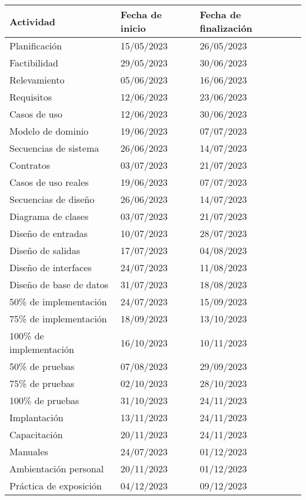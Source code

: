 \begin{center}
\begin{longtable}{
	| p{5.3cm} | p{5.3cm} | p{5.3cm} |
}
	\hline
	\rowcolor{lightgray}
	\hfil \textbf{Actividad} &
	\hfil \textbf{Fecha de inicio} &
	\hfil \textbf{Fecha de finalizaci\'on}
	\\
	\hline
	\endhead
 	Planificaci\'on &
 	15/05/2023 & 26/05/2023 \\
	\hline
 	Factibilidad &
 	29/05/2023 & 30/06/2023 \\
	\hline
 	Relevamiento &
 	05/06/2023 & 16/06/2023 \\
	\hline
 	Requisitos &
 	12/06/2023 & 23/06/2023 \\
	\hline
 	Casos de uso &
 	12/06/2023 & 30/06/2023 \\
	\hline
 	Modelo de dominio &
 	19/06/2023 & 07/07/2023 \\
	\hline
 	Secuencias de sistema &
 	26/06/2023 & 14/07/2023 \\
	\hline
 	Contratos &
 	03/07/2023 & 21/07/2023 \\
	\hline
 	Casos de uso reales &
 	19/06/2023 & 07/07/2023 \\
	\hline
 	Secuencias de dise\~no &
 	26/06/2023 & 14/07/2023 \\
	\hline
 	Diagrama de clases &
 	03/07/2023 & 21/07/2023 \\
	\hline
 	Dise\~no de entradas &
 	10/07/2023 & 28/07/2023 \\
	\hline
 	Dise\~no de salidas &
 	17/07/2023 & 04/08/2023 \\
	\hline
 	Dise\~no de interfaces &
 	24/07/2023 & 11/08/2023 \\
	\hline
 	Dise\~no de base de datos &
 	31/07/2023 & 18/08/2023 \\
	\hline
 	50\% de implementaci\'on &
 	24/07/2023 & 15/09/2023 \\
	\hline
 	75\% de implementaci\'on &
 	18/09/2023 & 13/10/2023 \\
	\hline
 	100\% de implementaci\'on &
 	16/10/2023 & 10/11/2023 \\
	\hline
 	50\% de pruebas &
 	07/08/2023 & 29/09/2023 \\
	\hline
 	75\% de pruebas &
 	02/10/2023 & 28/10/2023 \\
	\hline
 	100\% de pruebas &
 	31/10/2023 & 24/11/2023 \\
	\hline
 	Implantaci\'on &
 	13/11/2023 & 24/11/2023 \\
	\hline
 	Capacitaci\'on &
 	20/11/2023 & 24/11/2023 \\
	\hline
 	Manuales &
 	24/07/2023 & 01/12/2023 \\
	\hline
 	Ambientaci\'on personal &
 	20/11/2023 & 01/12/2023 \\
	\hline
 	Pr\'actica de exposici\'on &
 	04/12/2023 & 09/12/2023 \\
	\hline
\end{longtable}
\end{center}
